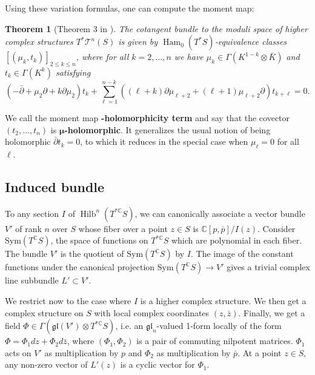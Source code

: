 \documentclass[11pt]{amsart}
\newtheorem{thm}{Theorem}
\numberwithin{thm}{section} %
\numberwithin{equation}{section} %
\numberwithin{figure}{section} %
\newcommand*{\C}{\mathbb{C}}
\renewcommand*{\S}{S}
\newcommand*{\mf}{\mathfrak}
\newcommand*{\mc}{\mathcal}
\newcommand*{\cotang}{T^*\mc{T}^n(S)}
\DeclareMathOperator{\Hilb}{Hilb}
\DeclareMathOperator{\Ham}{Ham}
\begin{document}
Using these variation formulas, one can compute the moment map:
\begin{thm}[Theorem 3 in \cite{FockThomas}]\label{conditionC}
The cotangent bundle to the moduli space of higher complex structures $\cotang$ is given by $\Ham_0(T^*\S)$-equivalence classes $[(\mu_k,t_k)]_{2\leq k\leq n}$, where for all $k=2,...,n$ we have $\mu_k \in \Gamma(K^{1-k}\otimes \bar{K})$ and $t_k \in \Gamma(K^k)$ satisfying
\begin{equation}\label{Eq:mu-holomorphic}
(-\bar{\partial}\!+\!\mu_2\partial\!+\!k\partial\mu_2)t_{k}+\sum_{\ell=1}^{n-k}((\ell\!+\!k)\partial\mu_{\ell+2}+(\ell\!+\!1)\mu_{\ell+2}\partial)t_{k+\ell}=0.
\end{equation}
\end{thm}
We call the moment map \boldsymbol{$\mu$}\textbf{-holomorphicity term} and say that the covector $(t_2,...,t_n)$ is $\boldsymbol{\mu}$\textbf{-holomorphic}. It generalizes the usual notion of being holomorphic $\bar\partial t_k=0$, to which it reduces in the special case when $\mu_\ell=0$ for all $\ell$.



\subsection{Induced bundle}\label{indbundle}

To any section $I$ of $\Hilb^n(T^{*\C}\S)$, we can canonically associate a vector bundle $V'$ of rank $n$ over $\S$ whose fiber over a point $z\in S$ is $\mathbb{C}[p,\bar{p}]/I(z)$. Consider $\mathrm{Sym}(T^{\C}\S)$, the space of functions on $T^{*\C}\S$ which are polynomial in each fiber. The bundle $V'$ is the quotient of $\mathrm{Sym}(T^{\C}\S)$ by $I$. The image of the constant functions under the canonical projection $\mathrm{Sym}(T^{\C}\S)\to V'$ gives a trivial complex line subbundle $L'\subset V'$.

We restrict now to the case where $I$ is a higher complex structure. We then get a complex structure on $S$ with local complex coordinates $(z,\bar{z})$. 
Finally, we get a field $\Phi \in \Gamma(\mathfrak{gl}(V')\otimes T^{*\C}\S)$, i.e. an $\mf{gl}_n$-valued 1-form locally of the form $\Phi = \Phi_1dz+\Phi_2d\bar{z}$, where $(\Phi_1,\Phi_2)$ is a pair of commuting nilpotent matrices. $\Phi_1$ acts on $V'$ as multiplication by $p$ and $\Phi_2$ as multiplication by $\bar{p}$. At a point $z\in\S$, any non-zero vector of $L'(z)$ is a cyclic vector for $\Phi_1$.
\end{document}
